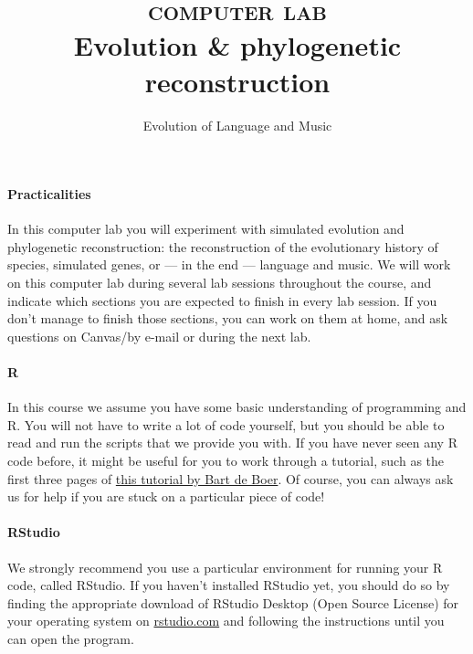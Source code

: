 \documentclass[a4paper, 9pt]{article}
\title{\textsc{computer lab}\\ \textbf{Evolution \& phylogenetic reconstruction}}
\author{Evolution of Language and Music}
\date{}
\begin{document}
\maketitle
{}

\paragraph{Practicalities}
In this computer lab you will experiment with simulated evolution and phylogenetic reconstruction: the reconstruction of the evolutionary history of species, simulated genes, or --- in the end --- language and music. 
We will work on this computer lab during several lab sessions throughout the course, and indicate which sections you are expected to finish in every lab session.
If you don't manage to finish those sections, you can work on them at home, and ask questions on Canvas/by e-mail or during the next lab.

\paragraph{R} 
In this course we assume you have some basic understanding of programming and R. You will not have to write a lot of code yourself, but you should be able to read and run the scripts that we provide you with. If you have never seen any R code before, it might be useful for you to work through a tutorial, such as the first three pages of \href{http://projects.illc.uva.nl/LaCo/CLAS/clc13/assignments/deboer13rtutorial.pdf}{this tutorial by Bart de Boer}.
Of course, you can always ask us for help if you are stuck on a particular piece of code!

\paragraph{RStudio}
We strongly recommend you use a particular environment for running your R code, called RStudio. If you haven't installed RStudio yet, you should do so by finding the appropriate download of RStudio Desktop (Open Source License) for your operating system on \href{https://rstudio.com}{rstudio.com} and following the instructions until you can open the program.
\end{document}
